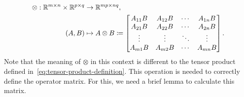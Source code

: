 \begin{equation*}
    \begin{aligned}
        \otimes : \mathbb{R}^{m\times n} \times \mathbb{R}^{p\times q} &\to \mathbb{R}^{mp\times nq}, \\
        (A,B) &\mapsto A\otimes B \coloneqq \begin{bmatrix}
            A_{11}B & A_{12}B & \cdots & A_{1n}B \\
            A_{21}B & A_{22}B & \cdots & A_{2n}B \\
            \vdots & \vdots & \ddots & \vdots \\
            A_{m1}B & A_{m2}B & \cdots & A_{mn}B
        \end{bmatrix}. \\
    \end{aligned}
\end{equation*}
Note that the meaning of $\otimes$ in this context is different to the tensor product defined in~\ref{eq:tensor-product-definition}. This operation is needed to correctly define the operator matrix. For this, we need a brief lemma to calculate this matrix. 
